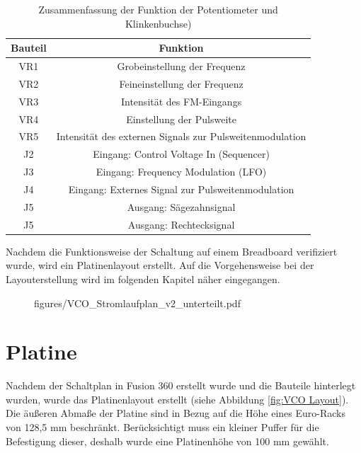 \begin{table}[h]
	\centering
	\caption{Zusammenfassung der Funktion der Potentiometer und Klinkenbuchse)}
	\begin{tabular}{|c|c|}
		\hline
		Bauteil & Funktion \\
		\hline
		VR1 & Grobeinstellung der Frequenz \\
		\hline
		VR2 & Feineinstellung der Frequenz \\
		\hline
		VR3 & Intensität des FM-Eingangs \\
		\hline
		VR4 & Einstellung der Pulsweite\\
		\hline
		VR5 & Intensität des externen Signals zur Pulsweitenmodulation \\
		\hline
		J2 & Eingang: Control Voltage In (Sequencer) \\
		\hline
		J3 & Eingang: Frequency Modulation (LFO) \\
		\hline
		J4 &  Eingang: Externes Signal zur Pulsweitenmodulation\\
		\hline
		J5 &  Ausgang: Sägezahnsignal\\
		\hline
		J5 &  Ausgang: Rechtecksignal \\
		\hline
	\end{tabular}
	\label{tab:VCO_Signale}
\end{table}


Nachdem die Funktionsweise der Schaltung auf einem Breadboard verifiziert wurde, wird ein Platinenlayout erstellt.
Auf die Vorgehensweise bei der Layouterstellung wird im folgenden Kapitel näher eingegangen.



\newpage
\begin{figure}[h]
\centering
 {figures/VCO_Stromlaufplan_v2_unterteilt.pdf}
\label{fig:VCO_Stromlaufplan_v2}
\end{figure}

\newpage

\section{Platine}
Nachdem der Schaltplan in Fusion 360 erstellt wurde und die Bauteile hinterlegt wurden, wurde das Platinenlayout erstellt (siehe Abbildung \ref{fig:VCO Layout}).
Die äußeren Abmaße der Platine sind in Bezug auf die Höhe eines Euro-Racks von 128,5 mm beschränkt. 
Berücksichtigt muss ein kleiner Puffer für die Befestigung dieser, deshalb wurde eine Platinenhöhe von 100 mm gewählt.

